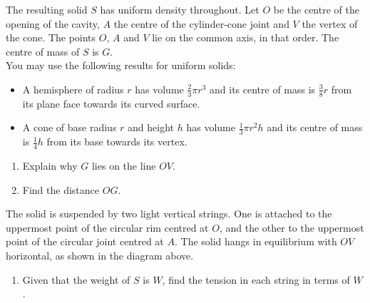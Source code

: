 \documentclass[leqno]{article}
\begin{document}
\begin{enumerate}[
  label=\textbf{\arabic*.},
  leftmargin=*,
  topsep=0pt,
  partopsep=0pt,
  parsep=0pt
]
The resulting solid $S$ has uniform density throughout. Let $O$ be the centre of the opening of the cavity, $A$ the centre of the cylinder-cone joint and $V$ the vertex of the cone. The points $O$, $A$ and $V$ lie on the common axis, in that order. The centre of mass of $S$ is $G$. \\
You may use the following results for uniform solids:
\begin{itemize}[nosep]
\item A hemisphere of radius $r$ has volume $\frac{2}{3}\pi r^3$ and its centre of mass is $\frac38 r$ from its plane face towards its curved surface.
\item A cone of base radius $r$ and height $h$ has volume $\frac{1}{3}\pi r^2h$ and its centre of mass is $\frac14 h$ from its base towards its vertex.
\end{itemize}

\begin{enumerate}[label=\textbf{(\alph*)}]
\item Explain why $G$ lies on the line $OV$.  \\
\item Find the distance $OG$.  \\
\end{enumerate}
The solid is suspended by two light vertical strings. One is attached to the uppermost point of the circular rim centred at $O$, and the other to the uppermost point of the circular joint centred at $A$. The solid hangs in equilibrium with $OV$ horizontal, as shown in the diagram above. \\
\begin{enumerate}[label=\textbf{(\alph*)}, resume]
\item Given that the weight of $S$ is $W$, find the tension in each string in terms of $W$.  \\
\end{enumerate}

\newpage

\questionitem


\end{enumerate}
\end{document}
